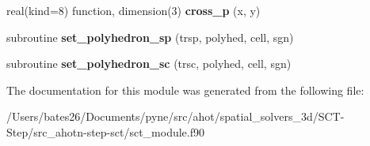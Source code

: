\begin{DoxyCompactItemize}
\item 
\hypertarget{classsct__module_ad149f8f31c02c110bf796ddd9ae50ed3}{real(kind=8) function, dimension(3) {\bfseries cross\+\_\+p} (x, y)}\label{classsct__module_ad149f8f31c02c110bf796ddd9ae50ed3}

\item 
\hypertarget{classsct__module_a43a90e2d39d5a4ea59edb46d8729eff4}{subroutine {\bfseries set\+\_\+polyhedron\+\_\+sp} (trsp, polyhed, cell, sgn)}\label{classsct__module_a43a90e2d39d5a4ea59edb46d8729eff4}

\item 
\hypertarget{classsct__module_ab8166d3e088b06fe79807d7aa629e8e4}{subroutine {\bfseries set\+\_\+polyhedron\+\_\+sc} (trsc, polyhed, cell, sgn)}\label{classsct__module_ab8166d3e088b06fe79807d7aa629e8e4}

\end{DoxyCompactItemize}


The documentation for this module was generated from the following file\+:\begin{DoxyCompactItemize}
\item 
/\+Users/bates26/\+Documents/pyne/src/ahot/spatial\+\_\+solvers\+\_\+3d/\+S\+C\+T-\/\+Step/src\+\_\+ahotn-\/step-\/sct/sct\+\_\+module.\+f90\end{DoxyCompactItemize}

